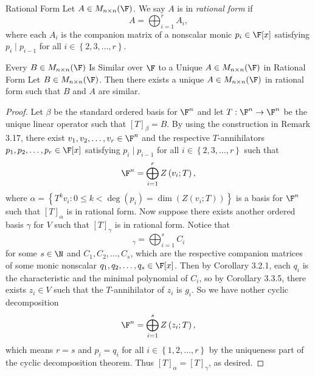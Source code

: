 \documentclass[linearalgebraII]{subfiles}
\begin{document}
    \begin{definition}{Rational Form}{}
        Let $A\in M_{n\times n}(\F)$. We say $A$ is in \emph{rational form} if
        \begin{equation*}
            A = \bigoplus^{r}_{i=1} A_i,
        \end{equation*}
        where each $A_i$ is the companion matrix of a nonscalar monic $p_i\in\F[x]$ satisfying $p_i\mid p_{i-1}$ for all $i\in\left\lbrace 2,3,\ldots,r \right\rbrace $.
    \end{definition}

    \begin{theorem}{Every $B\in M_{n\times n}(\F)$ Is Similar over $\F$ to a Unique $A\in M_{n\times n}(\F)$ in Rational Form}
        Let $B\in M_{n\times n}(\F)$. Then there exists a unique $A\in M_{n\times n}(\F)$ in rational form such that $B$ and $A$ are similar.
    \end{theorem}

    \begin{proof}
        Let $\beta$ be the standard ordered basis for $\F^n$ and let $T:\F^n\to\F^n$ be the unique linear operator such that $[T]_\beta = B$. By using the construction in Remark 3.17, there exist $v_1,v_2,\ldots,v_r\in\F^n$ and the respective $T$-annihilators $p_1,p_2,\ldots,p_r\in\F[x]$ satisfying $p_i\mid p_{i-1}$ for all $i\in \left\lbrace 2,3,\ldots,r \right\rbrace$ such that
        \begin{equation*}
            \F^n = \bigoplus^{r}_{i=1} Z\left( v_i;T \right) ,
        \end{equation*}
        where $\alpha = \left\lbrace T^kv_i:0\leq k< \deg\left( p_i \right) = \dim\left( Z\left( v_i;T \right)  \right)  \right\rbrace$ is a basis for $\F^n$ such that $[T]_\alpha$ is in rational form. Now suppose there exists another ordered basis $\gamma$ for $V$ such that $[T]_\gamma$ is in rational form. Notice that
        \begin{equation*}
            [T]_\gamma = \bigoplus^{s}_{i=1} C_i
        \end{equation*}
        for some $s\in\N$ and $C_1,C_2, \ldots, C_s$, which are the respective companion matrices of some monic nonscalar $q_1,q_2,\ldots,q_s\in\F[x]$. Then by Corollary 3.2.1, each $q_i$ is the characteristic and the minimal polynomial of $C_i$, so by Corollary 3.3.5, there exists $z_i\in V$ such that the $T$-annihilator of $z_i$ is $g_i$. So we have nother cyclic decomposition
        \begin{equation*}
            \F^n = \bigoplus^{s}_{i=1} Z\left( z_i;T \right) ,
        \end{equation*}
        which means $r=s$ and $p_i=q_i$ for all $i\in \left\lbrace 1,2,\ldots,r \right\rbrace$ by the uniqueness part of the cyclic decomposition theorem. Thus $[T]_\alpha = [T]_\gamma$, as desired.
    \end{proof}
\end{document}
